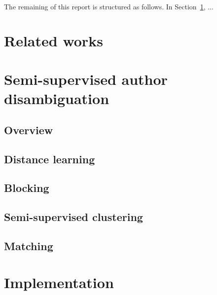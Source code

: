 \documentclass{article}
\begin{document}
The remaining of this report is structured as follows. In Section~\ref{related-works}, ...



\section{Related works}
\label{related-works}



\section{Semi-supervised author disambiguation}
\label{methods}

\subsection{Overview}

\subsection{Distance learning}

\subsection{Blocking}

\subsection{Semi-supervised clustering}

\subsection{Matching}



\section{Implementation}
\label{implementation}
\end{document}
